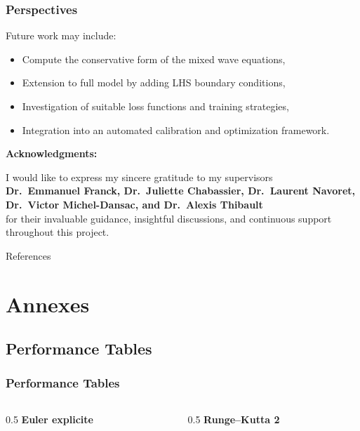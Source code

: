 \documentclass[11pt]{beamer}
\newcommand{\slideTitle}[1]{\begin{frame}\frametitle{#1}}
\begin{document}
\slideTitle{Perspectives}
Future work may include:
\begin{itemize}
    \item Compute the conservative form of the mixed wave equations,
    \item Extension to full model by adding LHS boundary conditions,
    \item Investigation of suitable loss functions and training strategies,
    \item Integration into an automated calibration and optimization framework.
\end{itemize}

\vspace{2em}
\textbf{Acknowledgments:} 
\vspace{0.5em}

I would like to express my sincere gratitude to my supervisors\\[0.2em]
\textbf{Dr.\ Emmanuel Franck, Dr.\ Juliette Chabassier, Dr.\ Laurent Navoret,\\
Dr.\ Victor Michel-Dansac, and Dr.\ Alexis Thibault}\\[0.4em]
for their invaluable guidance, insightful discussions, and continuous
support throughout this project.
\end{frame}

\begin{frame}[allowframebreaks]{References}
\printbibliography
\end{frame}

\section{Annexes}
\subsection{Performance Tables}

\slideTitle{Performance Tables}
\begin{columns}[T]
    \begin{column}{0.5\textwidth}
        \centering
        \textbf{Euler explicite}\\[0.5em]
        
    \end{column}
    \begin{column}{0.5\textwidth}
        \centering
        \textbf{Runge--Kutta 2}\\[0.5em]
        
    \end{column}
\end{columns}
\end{frame}
\end{document}
